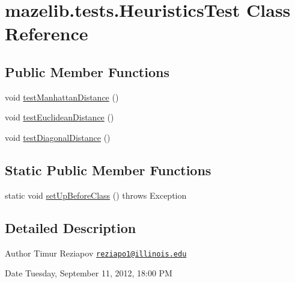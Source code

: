 \hypertarget{classmazelib_1_1tests_1_1_heuristics_test}{\section{mazelib.\-tests.\-Heuristics\-Test Class Reference}
\label{classmazelib_1_1tests_1_1_heuristics_test}
}
\subsection*{Public Member Functions}
\begin{DoxyCompactItemize}
\item 
void \hyperlink{classmazelib_1_1tests_1_1_heuristics_test_a825dc5d9bf79db08ad843080b0e72b7b}{test\-Manhattan\-Distance} ()
\item 
void \hyperlink{classmazelib_1_1tests_1_1_heuristics_test_a4a027f794b8e182bf3ae5703e8dd103f}{test\-Euclidean\-Distance} ()
\item 
void \hyperlink{classmazelib_1_1tests_1_1_heuristics_test_ab6264fc89c89e6d0aec1985c0b4cb95d}{test\-Diagonal\-Distance} ()
\end{DoxyCompactItemize}
\subsection*{Static Public Member Functions}
\begin{DoxyCompactItemize}
\item 
static void \hyperlink{classmazelib_1_1tests_1_1_heuristics_test_a3854f2461cbcbad011be38c4c47b0350}{set\-Up\-Before\-Class} ()  throws Exception 
\end{DoxyCompactItemize}


\subsection{Detailed Description}
\begin{DoxyAuthor}{Author}
Timur Reziapov \href{mailto:reziapo1@illinois.edu}{\tt reziapo1@illinois.\-edu} 
\end{DoxyAuthor}
\begin{DoxyDate}{Date}
Tuesday, September 11, 2012, 18\-:00 P\-M 
\end{DoxyDate}


